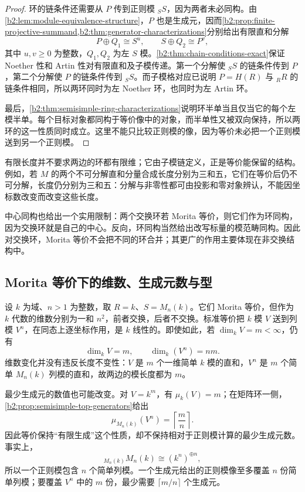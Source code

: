 \begin{proof}
	环的链条件还需要从 \(P\) 传到正则模 \({}_SS\)，因为两者未必同构。由\cref{b2:lem:module-equivalence-structure}，\(P\) 也是生成元，因而\cref{b2:prop:finite-projective-summand,b2:thm:generator-characterizations}分别给出有限直和分解
	\[
		P\oplus Q_1\cong S^u,\qquad S\oplus Q_2\cong P^v,
	\]
	其中 \(u,v\ge0\) 为整数，\(Q_1,Q_2\) 为左 \(S\) 模。\cref{b2:thm:chain-conditions-exact}保证 Noether 性和 Artin 性对有限直和及子模传递。第一个分解使 \({}_SS\) 的链条件传到 \(P\)，第二个分解使 \(P\) 的链条件传到 \({}_SS\)。而子模格对应已说明 \(P=H(R)\) 与 \({}_RR\) 的链条件相同，所以两环同时为左 Noether 环，也同时为左 Artin 环。

	最后，\cref{b2:thm:semisimple-ring-characterizations}说明环半单当且仅当它的每个左模半单。每个目标对象都同构于等价像中的对象，而半单性又被双向保持，所以两环的这一性质同时成立。这里不能只比较正则模的像，因为等价未必把一个正则模送到另一个正则模。
\end{proof}

有限长度并不要求两边的环都有限维；它由子模链定义，正是等价能保留的结构。例如，若 \(M\) 的两个不可分解直和分量合成长度分别为三和五，它们在等价后仍不可分解，长度仍分别为三和五：分解与非零性都可由投影和零对象辨认，不能因坐标数改变而改变这些长度。

\ProseParagraphBreak
中心同构也给出一个实用限制：两个交换环若 Morita 等价，则它们作为环同构，因为交换环就是自己的中心。反向，环同构当然给出改写标量的模范畴同构。因此对交换环，Morita 等价不会把不同的环合并；其更广的作用主要体现在非交换结构中。

\subsection{Morita 等价下的维数、生成元数与型}
\label{b2:subsec:1604:03}

设 \(k\) 为域、\(n>1\) 为整数，取 \(R=k\)、\(S=M_n(k)\)。它们 Morita 等价，但作为 \(k\) 代数的维数分别为一和 \(n^2\)，前者交换，后者不交换。标准等价把 \(k\) 模 \(V\) 送到列模 \(V^n\)，在同态上逐坐标作用，是 \(k\) 线性的。即使如此，若 \(\dim_kV=m<\infty\)，仍有
\[
	\dim_kV=m,\qquad \dim_k(V^n)=nm.
\]
维数变化并没有违反长度不变性：\(V\) 是 \(m\) 个一维简单 \(k\) 模的直和，\(V^n\) 是 \(m\) 个简单 \(M_n(k)\) 列模的直和，故两边的模长度都为 \(m\)。

\ProseParagraphBreak
最少生成元的数值也可能改变。对 \(V=k^m\)，有 \(\mu_k(V)=m\)；在矩阵环一侧，\cref{b2:prop:semisimple-top-generators}给出
\[
	\mu_{M_n(k)}(V^n)=\left\lceil\frac mn\right\rceil.
\]
因此等价保持“有限生成”这个性质，却不保持相对于正则模计算的最少生成元数。事实上，
\[
	{}_{M_n(k)}M_n(k)\cong(k^n)^{\oplus n},
\]
所以一个正则模包含 \(n\) 个简单列模。一个生成元给出的正则模像至多覆盖 \(n\) 份简单列模；要覆盖 \(V^n\) 中的 \(m\) 份，最少需要 \(\lceil m/n\rceil\) 个生成元。

